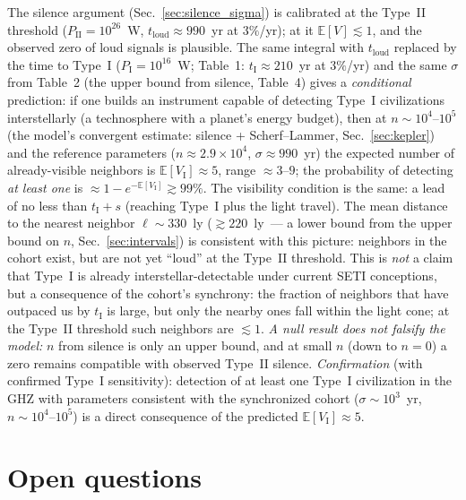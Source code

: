 \documentclass[11pt,a4paper]{article}
\begin{document}
The silence argument (Sec.~\ref{sec:silence_sigma}) is calibrated at the Type~II threshold ($P_{\mathrm{II}} = 10^{26}$~W, $t_{\mathrm{loud}} \approx 990$~yr at $3\%$/yr); at it $\mathbb{E}[V] \lesssim 1$, and the observed zero of loud signals is plausible. The same integral with $t_{\mathrm{loud}}$ replaced by the time to Type~I ($P_{\mathrm{I}} = 10^{16}$~W; Table~1: $t_{\mathrm{I}} \approx 210$~yr at $3\%$/yr) and the same $\sigma$ from Table~2 (the upper bound from silence, Table~4) gives a \emph{conditional} prediction: if one builds an instrument capable of detecting Type~I civilizations interstellarly (a technosphere with a planet's energy budget), then at $n \sim 10^4$--$10^5$ (the model's convergent estimate: silence + Scherf--Lammer, Sec.~\ref{sec:kepler}) and the reference parameters ($n \approx 2.9\times10^4$, $\sigma \approx 990$~yr) the expected number of already-visible neighbors is $\mathbb{E}[V_{\mathrm{I}}] \approx 5$, range $\approx 3$--$9$; the probability of detecting \emph{at least one} is $\approx 1 - e^{-\mathbb{E}[V_{\mathrm{I}}]} \gtrsim 99\%$. The visibility condition is the same: a lead of no less than $t_{\mathrm{I}} + s$ (reaching Type~I plus the light travel). The mean distance to the nearest neighbor $\ell \sim 330$~ly ($\gtrsim 220$~ly~--- a lower bound from the upper bound on $n$, Sec.~\ref{sec:intervals}) is consistent with this picture: neighbors in the cohort exist, but are not yet ``loud'' at the Type~II threshold. This is \emph{not} a claim that Type~I is already interstellar-detectable under current SETI conceptions, but a consequence of the cohort's synchrony: the fraction of neighbors that have outpaced us by $t_{\mathrm{I}}$ is large, but only the nearby ones fall within the light cone; at the Type~II threshold such neighbors are $\lesssim 1$. \emph{A null result does not falsify the model:} $n$ from silence is only an upper bound, and at small $n$ (down to $n=0$) a zero remains compatible with observed Type~II silence. \emph{Confirmation} (with confirmed Type~I sensitivity): detection of at least one Type~I civilization in the GHZ with parameters consistent with the synchronized cohort ($\sigma \sim 10^3$~yr, $n \sim 10^4$--$10^5$) is a direct consequence of the predicted $\mathbb{E}[V_{\mathrm{I}}] \approx 5$.

\section{Open questions}
\label{sec:open}
\end{document}
